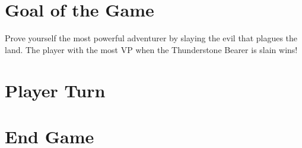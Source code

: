 \documentclass[12pt]{article}
\begin{document}
\begin{mdframed}[style = customFrame]
\begin{multicols*}{2}
\section*{Goal of the Game}
Prove yourself the most powerful adventurer by slaying the evil that plagues the land. The player with the most VP when the Thunderstone Bearer is slain wins!
\section*{Player Turn}
\section*{End Game}

\end{multicols*}
\end{mdframed}
\end{document}

